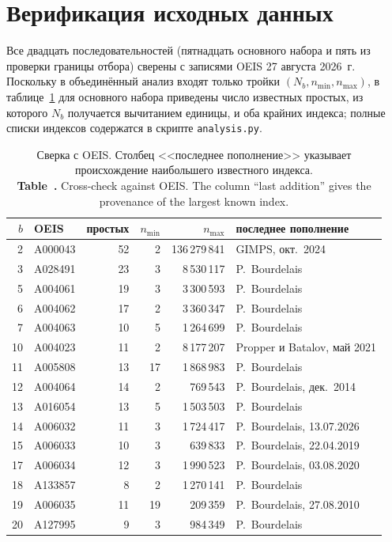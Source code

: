 \documentclass[11pt,a4paper]{article}
\newcommand{\encaptab}[1]{\\[3pt]\foreignlanguage{english}{%
  \textbf{Table~\thetable.} #1}}
\theoremstyle{plain}
\theoremstyle{remark}
\begin{document}
\appendix
\section{Верификация исходных данных}\label{app:data}

Все двадцать последовательностей (пятнадцать основного набора и пять из проверки
границы отбора) сверены с записями OEIS 27 августа 2026~г.
Поскольку в объединённый анализ входят только тройки $(N_b,n_{\min},n_{\max})$,
в таблице~\ref{tab:verify} для основного набора приведены число известных простых, из которого
$N_b$ получается вычитанием единицы, и оба крайних индекса; полные списки
индексов содержатся в скрипте \texttt{analysis.py}.

\begin{table}[h]
\centering
\caption{Сверка с OEIS. Столбец <<последнее пополнение>> указывает происхождение
наибольшего известного индекса.
\encaptab{Cross-check against OEIS. The column ``last addition'' gives the
provenance of the largest known index.}}
\label{tab:verify}
\small
\begin{tabular}{rlrrrl}
\toprule
$b$ & OEIS & простых & $n_{\min}$ & $n_{\max}$ & последнее пополнение\\
\midrule
2 & A000043 & 52 & 2 & 136\,279\,841 & GIMPS, окт.\ 2024\\
3 & A028491 & 23 & 3 & 8\,530\,117 & P.~Bourdelais\\
5 & A004061 & 19 & 3 & 3\,300\,593 & P.~Bourdelais\\
6 & A004062 & 17 & 2 & 3\,360\,347 & P.~Bourdelais\\
7 & A004063 & 10 & 5 & 1\,264\,699 & P.~Bourdelais\\
10 & A004023 & 11 & 2 & 8\,177\,207 & Propper и Batalov, май 2021\\
11 & A005808 & 13 & 17 & 1\,868\,983 & P.~Bourdelais\\
12 & A004064 & 14 & 2 & 769\,543 & P.~Bourdelais, дек.\ 2014\\
13 & A016054 & 13 & 5 & 1\,503\,503 & P.~Bourdelais\\
14 & A006032 & 11 & 3 & 1\,724\,417 & P.~Bourdelais, 13.07.2026\\
15 & A006033 & 10 & 3 & 639\,833 & P.~Bourdelais, 22.04.2019\\
17 & A006034 & 12 & 3 & 1\,990\,523 & P.~Bourdelais, 03.08.2020\\
18 & A133857 & 8 & 2 & 1\,270\,141 & P.~Bourdelais\\
19 & A006035 & 11 & 19 & 209\,359 & P.~Bourdelais, 27.08.2010\\
20 & A127995 & 9 & 3 & 984\,349 & P.~Bourdelais\\
\bottomrule
\end{tabular}
\end{table}
\end{document}
